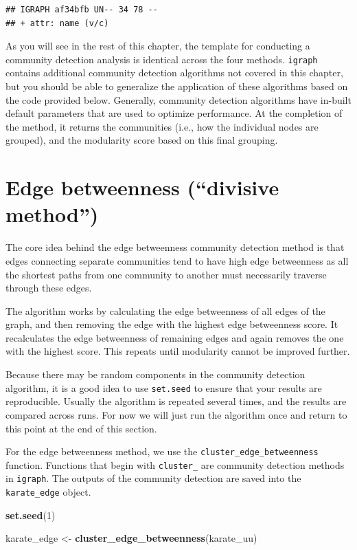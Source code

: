 \documentclass[
]{book}
\newenvironment{Shaded}{\begin{snugshade}}{\end{snugshade}}
\newcommand{\DecValTok}[1]{\textcolor[rgb]{0.00,0.00,0.81}{#1}}
\newcommand{\FunctionTok}[1]{\textcolor[rgb]{0.13,0.29,0.53}{\textbf{#1}}}
\newcommand{\NormalTok}[1]{#1}
\newcommand{\OtherTok}[1]{\textcolor[rgb]{0.56,0.35,0.01}{#1}}
\begin{document}
\begin{verbatim}
## IGRAPH af34bfb UN-- 34 78 -- 
## + attr: name (v/c)
\end{verbatim}

As you will see in the rest of this chapter, the template for conducting a community detection analysis is identical across the four methods. \texttt{igraph} contains additional community detection algorithms not covered in this chapter, but you should be able to generalize the application of these algorithms based on the code provided below. Generally, community detection algorithms have in-built default parameters that are used to optimize performance. At the completion of the method, it returns the communities (i.e., how the individual nodes are grouped), and the modularity score based on this final grouping.

\section{Edge betweenness (``divisive method'')}\label{edge-betweenness-divisive-method}

The core idea behind the edge betweenness community detection method is that edges connecting separate communities tend to have high edge betweenness as all the shortest paths from one community to another must necessarily traverse through these edges.

The algorithm works by calculating the edge betweenness of all edges of the graph, and then removing the edge with the highest edge betweenness score. It recalculates the edge betweenness of remaining edges and again removes the one with the highest score. This repeats until modularity cannot be improved further.

Because there may be random components in the community detection algorithm, it is a good idea to use \texttt{set.seed} to ensure that your results are reproducible. Usually the algorithm is repeated several times, and the results are compared across runs. For now we will just run the algorithm once and return to this point at the end of this section.

For the edge betweenness method, we use the \texttt{cluster\_edge\_betweenness} function. Functions that begin with \texttt{cluster\_} are community detection methods in \texttt{igraph}. The outputs of the community detection are saved into the \texttt{karate\_edge} object.

\begin{Shaded}
\begin{Highlighting}[]
\FunctionTok{set.seed}\NormalTok{(}\DecValTok{1}\NormalTok{)}

\NormalTok{karate\_edge }\OtherTok{\textless{}{-}} \FunctionTok{cluster\_edge\_betweenness}\NormalTok{(karate\_uu)}
\end{Highlighting}
\end{Shaded}
\end{document}
